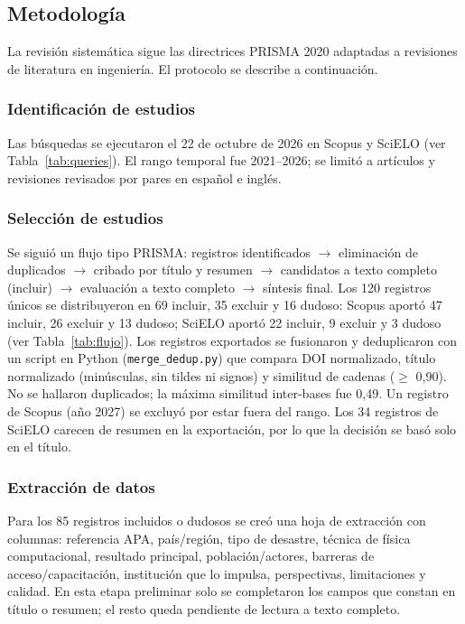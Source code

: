 \documentclass[12pt,a4paper]{article}
\begin{document}
\subsection{Metodología}
La revisión sistemática sigue las directrices PRISMA 2020 adaptadas a revisiones de literatura en ingeniería. El protocolo se describe a continuación.

\subsubsection{Identificación de estudios}
Las búsquedas se ejecutaron el 22 de octubre de 2026 en Scopus y SciELO (ver Tabla~\ref{tab:queries}). El rango temporal fue 2021--2026; se limitó a artículos y revisiones revisados por pares en español e inglés.

\subsubsection{Selección de estudios}
Se siguió un flujo tipo PRISMA: registros identificados $\rightarrow$ eliminación de duplicados $\rightarrow$ cribado por título y resumen $\rightarrow$ candidatos a texto completo (incluir) $\rightarrow$ evaluación a texto completo $\rightarrow$ síntesis final. Los 120 registros únicos se distribuyeron en 69 incluir, 35 excluir y 16 dudoso: Scopus aportó 47 incluir, 26 excluir y 13 dudoso; SciELO aportó 22 incluir, 9 excluir y 3 dudoso (ver Tabla~\ref{tab:flujo}). Los registros exportados se fusionaron y deduplicaron con un script en Python (\texttt{merge\_dedup.py}) que compara DOI normalizado, título normalizado (minúsculas, sin tildes ni signos) y similitud de cadenas ($\ge$ 0,90). No se hallaron duplicados; la máxima similitud inter-bases fue 0,49. Un registro de Scopus (año 2027) se excluyó por estar fuera del rango. Los 34 registros de SciELO carecen de resumen en la exportación, por lo que la decisión se basó solo en el título.

\subsubsection{Extracción de datos}
Para los 85 registros incluidos o dudosos se creó una hoja de extracción con columnas: referencia APA, país/región, tipo de desastre, técnica de física computacional, resultado principal, población/actores, barreras de acceso/capacitación, institución que lo impulsa, perspectivas, limitaciones y calidad. En esta etapa preliminar solo se completaron los campos que constan en título o resumen; el resto queda pendiente de lectura a texto completo.
\end{document}
